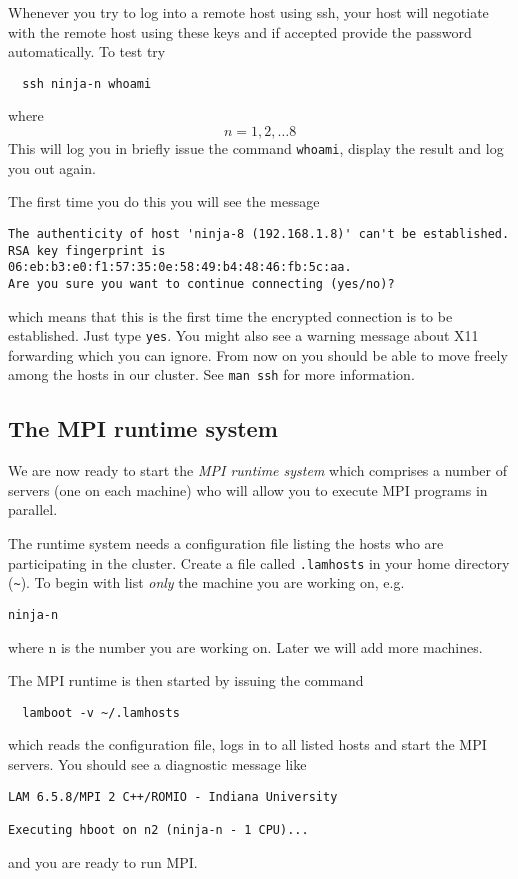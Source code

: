Whenever you try to log into a remote host using ssh, your host will
negotiate with the remote host using these keys and if accepted provide
the password automatically. To test try
\begin{verbatim}
  ssh ninja-n whoami
\end{verbatim}
where
\[
  n = 1, 2, \ldots 8
\]
This will log you in briefly issue the command \texttt{whoami},
display the result and log you out again.

The first time you do this you will see the message
\begin{verbatim}
The authenticity of host 'ninja-8 (192.168.1.8)' can't be established.
RSA key fingerprint is 06:eb:b3:e0:f1:57:35:0e:58:49:b4:48:46:fb:5c:aa.
Are you sure you want to continue connecting (yes/no)?
\end{verbatim}
which means that this is the first time the encrypted connection
is to be established. Just type \texttt{yes}.
You might also see a warning message about X11 forwarding which
you can ignore. From now on you should be able to move freely among
the hosts in our cluster.
See \texttt{man ssh} for more information.

\subsection*{The MPI runtime system}

We are now ready to start the \emph{MPI runtime system} which comprises a
number of servers (one on each machine) who will allow you to execute
MPI programs in parallel.

The runtime system needs a configuration file listing
the hosts who are participating in the cluster.
Create a file called \texttt{.lamhosts} in your
home directory (\verb+~+).
To begin with list \emph{only} the machine you are working on, e.g.
\begin{verbatim}
ninja-n
\end{verbatim}
where n is the number you are working on.
Later we will add more machines.

The MPI runtime is then started by issuing the command
\begin{verbatim}
  lamboot -v ~/.lamhosts
\end{verbatim}
which reads the configuration file, logs in to all listed hosts and
start the MPI servers.
You should see a diagnostic message like
\begin{verbatim}
LAM 6.5.8/MPI 2 C++/ROMIO - Indiana University

Executing hboot on n2 (ninja-n - 1 CPU)...
\end{verbatim}
and you are ready to run MPI.



